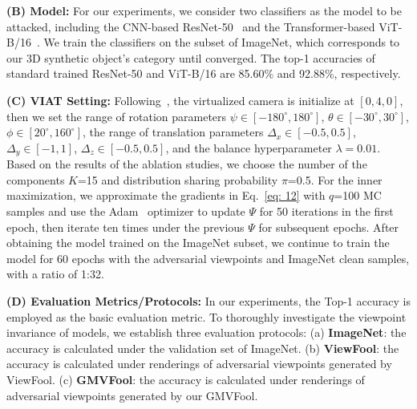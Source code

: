 \documentclass[10pt,journal,compsoc]{IEEEtran}
\begin{document}
\noindent \textbf{(B) Model:} For our experiments, we consider two classifiers as the model to be attacked, including the CNN-based ResNet-50~\cite{he2016deep} and the Transformer-based ViT-B/16~\cite{dosovitskiy2020image}. We train the classifiers on the subset of ImageNet, which corresponds to our 3D synthetic object’s category until converged. The top-1 accuracies of standard trained ResNet-50 and ViT-B/16 are 85.60\% and 92.88\%, respectively.

\noindent \textbf{(C) VIAT Setting:} Following~\cite{dong2022viewfool}, the virtualized camera is initialize at $[0,4,0]$, then we set the range of rotation parameters  $\psi \in [-180^{\circ}, 180^{\circ}]$, $\theta \in [-30^{\circ}, 30^{\circ}]$, $\phi \in [20^{\circ}, 160^{\circ}]$, the range of translation parameters $\Delta_x \in [-0.5, 0.5]$, $\Delta_y \in [-1, 1]$, $\Delta_z \in [-0.5, 0.5]$, and the balance hyperparameter $\lambda=0.01$. Based on the results of the ablation studies, we choose the number of the components $K$=15 and distribution sharing probability $\pi$=0.5. For the inner maximization, we approximate the gradients in Eq.~\eqref{eq: 12} with $q$=100 MC samples and use the Adam~\cite{kingma2014adam} optimizer to update $\Psi$ for 50 iterations in the first epoch, then iterate ten times under the previous $\Psi$ for subsequent epochs. After obtaining the model trained on the ImageNet subset, we continue to train the model for 60 epochs with the adversarial viewpoints and ImageNet clean samples, with a ratio of 1:32.

\noindent \textbf{(D) Evaluation Metrics/Protocols:} In our experiments, the Top-1 accuracy is employed as the basic evaluation metric. To thoroughly investigate the viewpoint invariance of models, we establish three evaluation protocols: (a) \textbf{ImageNet}: the accuracy is calculated under the validation set of ImageNet. (b) \textbf{ViewFool}: the accuracy is calculated under renderings of adversarial viewpoints generated by ViewFool. (c) \textbf{GMVFool}: the accuracy is calculated under renderings of adversarial viewpoints generated by our GMVFool.
\end{document}
